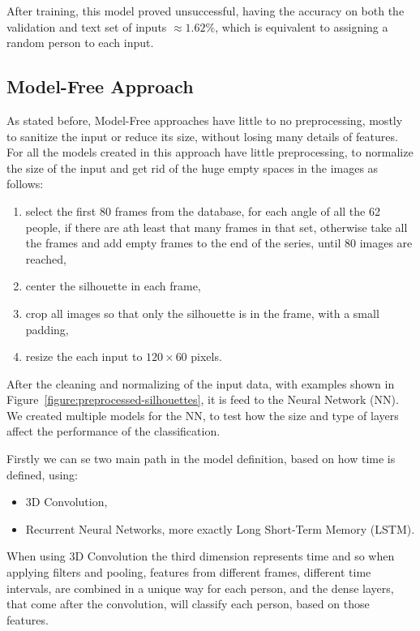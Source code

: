 \documentclass[12pt]{article}
\theoremstyle{definition}
\begin{document}
	After training, this model proved unsuccessful, having the accuracy on both the validation and text set of inputs $\approx 1.62\%$, which is equivalent to assigning a random person to each input.

	\subsection{Model-Free Approach}

	As stated before, Model-Free approaches have little to no preprocessing, mostly to sanitize the input or reduce its size, without losing many details of features. For all the models created in this approach have little preprocessing, to normalize the size of the input and get rid of the huge empty spaces in the images as follows:
	\begin{enumerate}
		\item select the first 80 frames from the database, for each angle of all the 62 people, if there are ath least that many frames in that set, otherwise take all the frames and add empty frames to the end of the series, until 80 images are reached,
		\item center the silhouette in each frame,
		\item crop all images so that only the silhouette is in the frame, with a small padding,
		\item resize the each input to $120 \times 60$ pixels.
	\end{enumerate}

	After the cleaning and normalizing of the input data, with examples shown in Figure~\ref{figure:preprocessed-silhouettes}, it is feed to the Neural Network (NN). We created multiple models for the NN, to test how the size and type of layers affect the performance of the classification.

	Firstly we can se two main path in the model definition, based on how time is defined, using:
	\begin{itemize}
		\item 3D Convolution,
		\item Recurrent Neural Networks, more exactly Long Short-Term Memory (LSTM).
	\end{itemize}

	When using 3D Convolution the third dimension represents time and so when applying filters and pooling, features from different frames, different time intervals, are combined in a unique way for each person, and the dense layers, that come after the convolution, will classify each person, based on those features.
\end{document}
